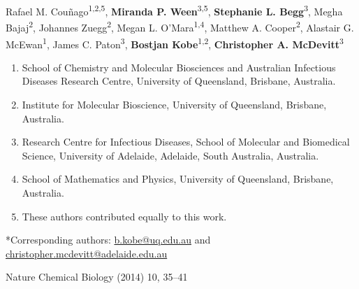 Rafael M. Couñago\textsuperscript{1,2,5}, \textbf{Miranda P. Ween}\textsuperscript{3,5}, \textbf{Stephanie L. Begg}\textsuperscript{3}, Megha Bajaj\textsuperscript{2}, Johannes Zuegg\textsuperscript{2}, Megan L. O’Mara\textsuperscript{1,4}, Matthew A. Cooper\textsuperscript{2}, Alastair G. McEwan\textsuperscript{1}, James C. Paton\textsuperscript{3}, \textbf{Bostjan Kobe}\textsuperscript{1,2}, \textbf{Christopher A. McDevitt}\textsuperscript{3}
\begin{enumerate}
\item School of Chemistry and Molecular Biosciences and Australian Infectious Diseases Research Centre, University of Queensland, Brisbane, Australia.
\item Institute for Molecular Bioscience, University of Queensland, Brisbane, Australia.
\item Research Centre for Infectious Diseases, School of Molecular and Biomedical Science, University of Adelaide, Adelaide, South Australia, Australia.
\item School of Mathematics and Physics, University of Queensland, Brisbane, Australia.
\item These authors contributed equally to this work.
\end{enumerate}

*Corresponding authors: \href{mailto:b.kobe@uq.edu.au}{b.kobe@uq.edu.au} and \href{christopher.mcdevitt@adelaide.edu.au}{christopher.mcdevitt@adelaide.edu.au} 

Nature Chemical Biology (2014) 10, 35–41